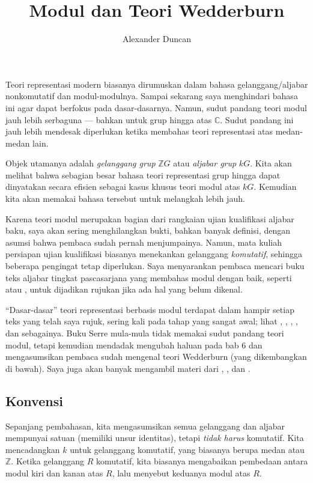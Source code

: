\documentclass[12pt]{article}
\theoremstyle{plain}
\theoremstyle{definition}
\theoremstyle{remark}
\numberwithin{equation}{section}
\begin{document}
\title{Modul dan Teori Wedderburn}
\author{Alexander Duncan}

\maketitle

Teori representasi modern biasanya dirumuskan dalam bahasa
gelanggang/aljabar nonkomutatif dan modul-modulnya.
Sampai sekarang saya menghindari bahasa ini agar dapat berfokus pada dasar-dasarnya.
Namun, sudut pandang teori modul jauh lebih serbaguna --- bahkan
untuk grup hingga atas $\mathbb{C}$.
Sudut pandang ini jauh lebih mendesak diperlukan ketika membahas teori
representasi atas medan-medan lain. 

Objek utamanya adalah \emph{gelanggang grup} $\mathbb{Z}G$
atau \emph{aljabar grup} $kG$. Kita akan melihat bahwa sebagian besar bahasa
teori representasi grup hingga dapat dinyatakan secara efisien
sebagai kasus khusus teori modul atas $kG$.
Kemudian kita akan memakai bahasa tersebut untuk melangkah lebih jauh.

Karena teori modul merupakan bagian dari rangkaian ujian kualifikasi aljabar baku,
saya akan sering menghilangkan bukti, bahkan banyak definisi, dengan
asumsi bahwa pembaca sudah pernah menjumpainya.
Namun, mata kuliah persiapan ujian kualifikasi biasanya menekankan gelanggang
\emph{komutatif}, sehingga beberapa pengingat tetap diperlukan.
Saya menyarankan pembaca mencari buku teks aljabar tingkat pascasarjana yang
membahas modul dengan baik, seperti \cite[\S{10}]{DF} atau \cite[\S{III}]{Lang},
untuk dijadikan rujukan jika ada hal yang belum dikenal.

“Dasar-dasar” teori representasi berbasis modul terdapat dalam
hampir setiap teks yang telah saya rujuk, sering kali pada tahap yang sangat awal; 
lihat \cite{DF}, \cite{Etingof}, \cite{FultonHarris}, \cite{Lang}, dan sebagainya.
Buku Serre \cite{Serre} mula-mula tidak memakai sudut pandang teori
modul, tetapi kemudian mendadak mengubah haluan pada bab 6 dan
mengasumsikan pembaca sudah mengenal teori Wedderburn (yang dikembangkan di bawah).
Saya juga akan banyak mengambil materi dari \cite[\S{12,13}]{AlperinBell},
\cite{AlperinLRT}, dan \cite{CurtisReiner}.

\subsection*{Konvensi}

Sepanjang pembahasan, kita mengasumsikan semua gelanggang dan aljabar mempunyai satuan
(memiliki unsur identitas), tetapi \emph{tidak harus} komutatif.
Kita mencadangkan $k$ untuk gelanggang komutatif, yang biasanya berupa
medan atau $\mathbb{Z}$.
Ketika gelanggang $R$ komutatif, kita biasanya mengabaikan
pembedaan antara modul kiri dan kanan atas $R$, lalu
menyebut keduanya modul atas $R$.
\end{document}
